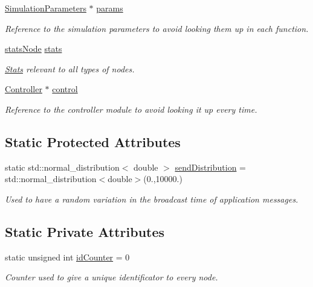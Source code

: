 \begin{DoxyCompactItemize}
\hyperlink{class_simulation_parameters}{Simulation\+Parameters} $\ast$ \hyperlink{class_node_base_aa6fb61208e4f5b7a841cd46fac297058}{params}
\begin{DoxyCompactList}\small\item\em Reference to the simulation parameters to avoid looking them up in each function. \end{DoxyCompactList}\item 
\hyperlink{_node_base_8h_a6d83bdf09c8e309d31f9330091b0d10d}{stats\+Node} \hyperlink{class_node_base_a12b20bca634637499bf55020c398424e}{stats}
\begin{DoxyCompactList}\small\item\em \hyperlink{class_stats}{Stats} relevant to all types of nodes. \end{DoxyCompactList}\item 
\hyperlink{class_controller}{Controller} $\ast$ \hyperlink{class_node_base_a89bfb79efc25d9508eb15a4184558c41}{control}
\begin{DoxyCompactList}\small\item\em Reference to the controller module to avoid looking it up every time. \end{DoxyCompactList}\end{DoxyCompactItemize}
\subsection*{Static Protected Attributes}
\begin{DoxyCompactItemize}
\item 
static std\+::normal\+\_\+distribution$<$ double $>$ \hyperlink{class_node_base_ab8e4cc30083c58d14b22d928a78cb8ac}{send\+Distribution} = std\+::normal\+\_\+distribution$<$double$>$(0.,10000.)
\begin{DoxyCompactList}\small\item\em Used to have a random variation in the broadcast time of application messages. \end{DoxyCompactList}\end{DoxyCompactItemize}
\subsection*{Static Private Attributes}
\begin{DoxyCompactItemize}
\item 
static unsigned int \hyperlink{class_node_base_a3d577a517665ac5bcf9ed9495945fe31}{id\+Counter} = 0
\begin{DoxyCompactList}\small\item\em Counter used to give a unique identificator to every node. \end{DoxyCompactList}\end{DoxyCompactItemize}
